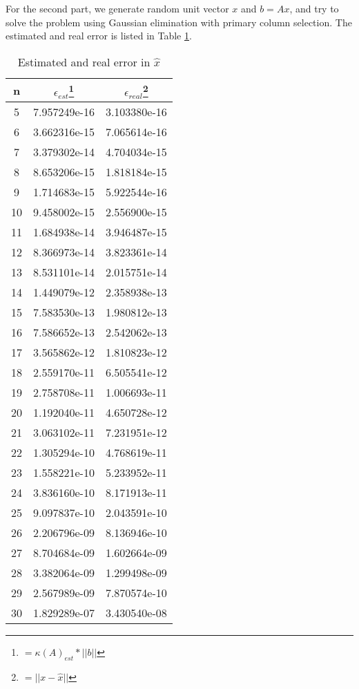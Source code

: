 \documentclass[11pt]{article}
\begin{document}
For the second part, we generate random unit vector $x$ and $b=Ax$, and try to solve the problem using Gaussian elimination with primary column selection.
The estimated and real error is listed in Table \ref{tab:linear-problem}.
\begin{table}[htbp]
	\centering
	\begin{tabular}{ccc}
		\hline
		n  & $\epsilon_{est}$\footnote{$=\kappa(A)_{est} * ||b||$} & $\epsilon_{real}$\footnote{$=||x-\hat{x}||$} \\
		\hline
		5  & 7.957249e-16      & 3.103380e-16       \\
		6  & 3.662316e-15      & 7.065614e-16       \\
		7  & 3.379302e-14      & 4.704034e-15       \\
		8  & 8.653206e-15      & 1.818184e-15       \\
		9  & 1.714683e-15      & 5.922544e-16       \\
		10 & 9.458002e-15      & 2.556900e-15       \\
		11 & 1.684938e-14      & 3.946487e-15       \\
		12 & 8.366973e-14      & 3.823361e-14       \\
		13 & 8.531101e-14      & 2.015751e-14       \\
		14 & 1.449079e-12      & 2.358938e-13       \\
		15 & 7.583530e-13      & 1.980812e-13       \\
		16 & 7.586652e-13      & 2.542062e-13       \\
		17 & 3.565862e-12      & 1.810823e-12       \\
		18 & 2.559170e-11      & 6.505541e-12       \\
		19 & 2.758708e-11      & 1.006693e-11       \\
		20 & 1.192040e-11      & 4.650728e-12       \\
		21 & 3.063102e-11      & 7.231951e-12       \\
		22 & 1.305294e-10      & 4.768619e-11       \\
		23 & 1.558221e-10      & 5.233952e-11       \\
		24 & 3.836160e-10      & 8.171913e-11       \\
		25 & 9.097837e-10      & 2.043591e-10       \\
		26 & 2.206796e-09      & 8.136946e-10       \\
		27 & 8.704684e-09      & 1.602664e-09       \\
		28 & 3.382064e-09      & 1.299498e-09       \\
		29 & 2.567989e-09      & 7.870574e-10       \\
		30 & 1.829289e-07      & 3.430540e-08       \\
		\hline
	\end{tabular}
	\caption{Estimated and real error in $\hat{x}$}
	\label{tab:linear-problem}
\end{table}
\end{document}
